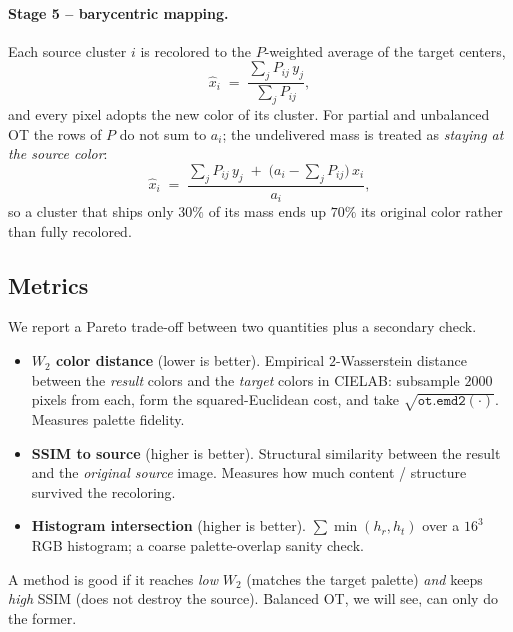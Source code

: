 \documentclass[11pt,a4paper]{article}
\newcommand{\code}[1]{\texttt{#1}}
\begin{document}
\paragraph{Stage 5 -- barycentric mapping.} Each source cluster $i$ is recolored
to the $P$-weighted average of the target centers,
\begin{equation}
  \label{eq:bary}
  \hat{x}_i \;=\; \frac{\sum_j P_{ij}\, y_j}{\sum_j P_{ij}},
\end{equation}
and every pixel adopts the new color of its cluster. For partial and unbalanced
OT the rows of $P$ do not sum to $a_i$; the undelivered mass is treated as
\emph{staying at the source color}:
\begin{equation}
  \label{eq:bary-keep}
  \hat{x}_i
  \;=\; \frac{\sum_j P_{ij}\, y_j \;+\; \bigl(a_i - \sum_j P_{ij}\bigr)\, x_i}
             {a_i},
\end{equation}
so a cluster that ships only $30\%$ of its mass ends up $70\%$ its original
color rather than fully recolored.

\subsection{Metrics}

We report a Pareto trade-off between two quantities plus a secondary check.

\begin{itemize}
  \item \textbf{$W_2$ color distance} (lower is better). Empirical $2$-Wasserstein
        distance between the \emph{result} colors and the \emph{target} colors in
        CIELAB: subsample $2000$ pixels from each, form the squared-Euclidean
        cost, and take $\sqrt{\code{ot.emd2}(\cdot)}$. Measures palette fidelity.
  \item \textbf{SSIM to source} (higher is better). Structural similarity between
        the result and the \emph{original source} image. Measures how much
        content / structure survived the recoloring.
  \item \textbf{Histogram intersection} (higher is better). $\sum \min(h_r, h_t)$
        over a $16^3$ RGB histogram; a coarse palette-overlap sanity check.
\end{itemize}

A method is good if it reaches \emph{low} $W_2$ (matches the target palette)
\emph{and} keeps \emph{high} SSIM (does not destroy the source). Balanced OT, we
will see, can only do the former.
\end{document}
